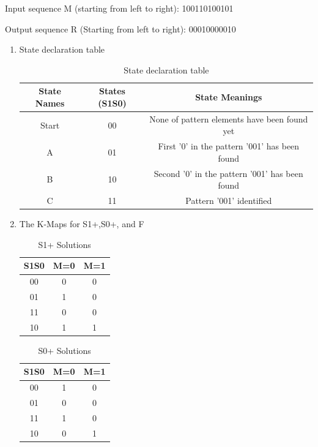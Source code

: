 \documentclass{article}
\begin{document}
\begin{enumerate}[label=(\alph*)]
    Input sequence M (starting from left to right):  
    100110100101  
    
    Output sequence R (Starting from left to right):  00010000010
\begin{enumerate}[label=(\roman*),nolistsep]
        \item State declaration table
        \begin{table}[h]
        \centering
        \begin{tabular}{|c|c|c|}
        \hline
        \textbf{State Names} & \textbf{States (S1S0)} & \textbf{State Meanings} \\\hline
        Start & 00 & None of pattern elements have been found yet \\\hline
        A & 01 & First '0' in the pattern '001' has been found \\\hline
        B & 10 & Second '0' in the pattern '001' has been found \\\hline
        C & 11 & Pattern '001' identified  \\
        \hline
        \end{tabular}
        \caption{State declaration table}
        \end{table}
        \item The K-Maps for S1+,S0+, and F
        \begin{table}[h]
        \centering
        \begin{tabular}{|c|c|c|}
        \hline
        S1S0 & M=0 & M=1 \\
        \hline
        00 & 0 & 0 \\
        01 & 1 & 0 \\
        11 & 0 & 0 \\
        10 & 1 & 1 \\
        \hline
        \end{tabular}
        \caption{S1+ Solutions}
        \end {table}
        
        \begin{table}[h]
        \centering
        \begin{tabular}{|c|c|c|}
        \hline
        S1S0 & M=0 & M=1 \\
        \hline
        00 & 1 & 0 \\
        01 & 0 & 0 \\
        11 & 1 & 0 \\
        10 & 0 & 1 \\
        \hline
        \end{tabular}
        \caption{S0+ Solutions}
        \end {table}
        

\end{enumerate}
\end{enumerate}
\end{document}

